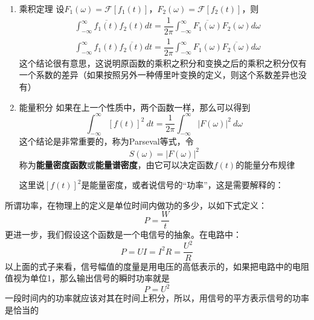 \begin{enumerate}
            \item{乘积定理}
                设$F_1(\omega) = \mathscr{F}[f_1(t)]$，$F_2(\omega) = \mathscr{F}[f_2(t)]$，则
                \begin{equation}
                    \begin{split}
                        &\int_{-\infty}^{\infty}\overline{f_1(t)}f_2(t)dt=\dfrac{1}{2\pi}\int_{-\infty}^{\infty}\overline{F_1(\omega)}F_2(\omega)d\omega\\
                        &\int_{-\infty}^{\infty}f_1(t)\overline{f_2(t)}dt=\dfrac{1}{2\pi}\int_{-\infty}^{\infty}F_1(\omega)\overline{F_2(\omega)}d\omega
                    \end{split}
                    \label{eq: 1.25}
                \end{equation}
                这个结论很有意思，这说明原函数的乘积之积分和变换之后的乘积之积分仅有一个系数的差异（如果按照另外一种傅里叶变换的定义，则这个系数差异也没有）

            \item{能量积分}
                如果在上一个性质中，两个函数一样，那么可以得到
                \begin{equation}
                    \int_{-\infty}^{\infty}[f(t)]^2\ dt=\dfrac{1}{2\pi}\int_{-\infty}^{\infty}|F(\omega)|^2\ d\omega
                    \label{eq: 1.26}
                \end{equation}
                这个结论是非常重要的，称为Parseval等式，令
                \begin{equation}
                    S(\omega)=|F(\omega)|^2
                    \label{eq: 1.27}
                \end{equation}
                称为\textbf{能量密度函数}或\textbf{能量谱密度}，由它可以决定函数$f(t)$的能量分布规律
    
                这里说$[f(t)]^2$是能量密度，或者说信号的“功率”，这是需要解释的：
        \end{enumerate}
        \begin{shaded}
            所谓功率，在物理上的定义是单位时间内做功的多少，以如下式定义：
            \begin{equation}
            P = \dfrac{W}{t}
            \label{eq: 1.28}
            \end{equation}
            更进一步，我们假设这个函数是一个电信号的抽象。在电路中：
            \begin{equation}
            P = UI = I^2R = \dfrac{U^2}{R}
            \label{eq: 1.29}
            \end{equation}
            以上面的式子来看，信号幅值的度量是用电压的高低表示的，如果把电路中的电阻值视为单位1，那么输出信号的瞬时功率就是
            \begin{equation}
            P = U^2
            \label{eq: 1.30}
            \end{equation}
            一段时间内的功率就应该对其在时间上积分，所以，用信号的平方表示信号的功率是恰当的
        \end{shaded}

